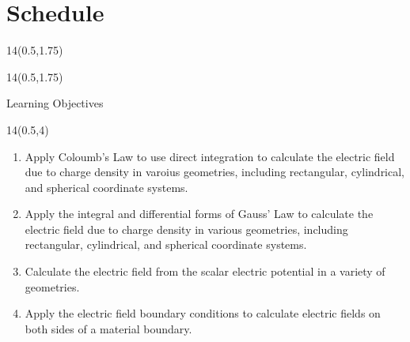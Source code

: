 \section{Schedule}
\renewcommand{\arraystretch}{1}
\begin{frame}{}
	\begin{textblock}{14}(0.5,1.75)
	\def\myfontsize{footnotesize}
	
	\end{textblock}
\end{frame}


\begin{frame}{}
\renewcommand{\arraystretch}{1}
	\begin{textblock}{14}(0.5,1.75)
	\def\myfontsize{footnotesize}
	
	\end{textblock}
\end{frame}



\begin{frame}{Learning Objectives}
	\begin{textblock}{14}(0.5,4)
	\begin{enumerate}[{3}.1]
		\item Apply Coloumb's Law to use direct integration to calculate the electric field due to charge density in varoius geometries, including rectangular, cylindrical, and spherical coordinate systems. 
		\item Apply the integral and differential forms of Gauss' Law to calculate the electric field due to charge density in various geometries, including rectangular, cylindrical, and spherical coordinate systems. 
		\item Calculate the electric field from the scalar electric potential in a variety of geometries.
		\item  Apply the electric field boundary conditions to calculate electric fields on both sides of a material boundary. 
	\end{enumerate}
	\end{textblock}
\end{frame}

